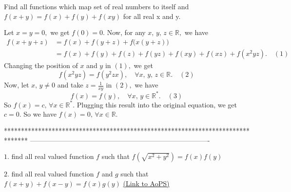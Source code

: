\begin{solution}
	\begin{tcolorbox}Find all functions which map set of real numbers to itself and $ f(x+y)=f(x)+f(y)+f(xy) $ for all real x and y.\end{tcolorbox}
Let $x=y=0,$ we get $f(0)=0.$ Now, for any $x,\,y,\,z \in \mathbb R,$ we have \[\begin{aligned} f(x+y+z)&=f(x)+f(y+z)+f\big(x(y+z)\big)\\ &=f(x)+f(y)+f(z)+f(yz)+f(xy)+f(xz)+f(x^2yz).\quad (1) \end{aligned}\] Changing the position of $x$ and $y$ in $(1),$ we get \[f(x^2yz)=f(y^2zx),\quad \forall x,\,y,\,z \in \mathbb R. \quad (2)\] Now, let $x,\,y \ne  0$ and take $z=\frac{1}{xy}$ in $(2),$ we have \[f(x)=f(y),\quad \forall x,\,y \in \mathbb R ^*.\quad (3)\] So $f(x)=c,\, \forall x \in \mathbb R^*.$ Plugging this result into the original equation, we get $c=0.$ So we have $f(x)=0,\, \forall x \in \mathbb R.$
\end{solution}
*******************************************************************************
-------------------------------------------------------------------------------

\begin{problem}
	$1.$ find all real valued function $f$ such that $f(\sqrt{x^2+y^2})=f(x)f(y)$

$2.$ find all real valued function $f$ and $g$ such that $f(x+y)+f(x-y)=f(x)g(y)$
	\flushright \href{https://artofproblemsolving.com/community/c6h573497}{(Link to AoPS)}
\end{problem}




